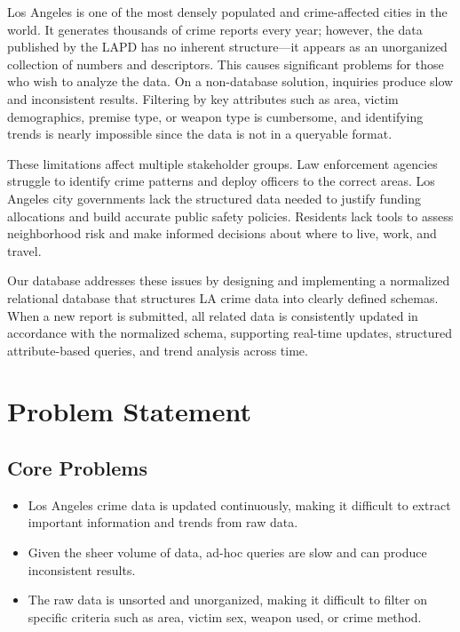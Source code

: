\documentclass[conference]{IEEEtran}
\begin{document}
Los Angeles is one of the most densely populated and crime-affected cities in the world. It generates thousands of crime reports every year; however, the data published by the LAPD has no inherent structure---it appears as an unorganized collection of numbers and descriptors. This causes significant problems for those who wish to analyze the data. On a non-database solution, inquiries produce slow and inconsistent results. Filtering by key attributes such as area, victim demographics, premise type, or weapon type is cumbersome, and identifying trends is nearly impossible since the data is not in a queryable format.

These limitations affect multiple stakeholder groups. Law enforcement agencies struggle to identify crime patterns and deploy officers to the correct areas. Los Angeles city governments lack the structured data needed to justify funding allocations and build accurate public safety policies. Residents lack tools to assess neighborhood risk and make informed decisions about where to live, work, and travel.

Our database addresses these issues by designing and implementing a normalized relational database that structures LA crime data into clearly defined schemas. When a new report is submitted, all related data is consistently updated in accordance with the normalized schema, supporting real-time updates, structured attribute-based queries, and trend analysis across time.

\section{Problem Statement}

\subsection{Core Problems}
\begin{itemize}
    \item Los Angeles crime data is updated continuously, making it difficult to extract important information and trends from raw data.
    \item Given the sheer volume of data, ad-hoc queries are slow and can produce inconsistent results.
    \item The raw data is unsorted and unorganized, making it difficult to filter on specific criteria such as area, victim sex, weapon used, or crime method.
\end{itemize}
\end{document}
